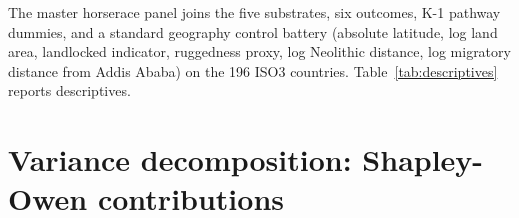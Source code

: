 \documentclass[11pt,letterpaper]{article}
\begin{document}
The master horserace panel joins the five substrates, six outcomes, K-1 pathway dummies, and a standard geography control battery (absolute latitude, log land area, landlocked indicator, ruggedness proxy, log Neolithic distance, log migratory distance from Addis Ababa) on the 196 ISO3 countries. Table~\ref{tab:descriptives} reports descriptives.

\begin{table}[H]
  \centering
  \caption{Descriptive statistics for the five pre-industrial substrates (climate bundle expanded into its four primitives), six outcomes, and geography controls. The 162-country sub-panel with non-missing values across all five substrates is the analysis sample for the principal exercises; per-outcome listwise samples vary (e.g.\ 194 on log population density, 161 on log GDP per capita, 144 on demographic-transition timing).}
  \label{tab:descriptives}
  \small
  
\end{table}

\section{Variance decomposition: Shapley-Owen contributions}
\label{sec:shapley}
\end{document}
